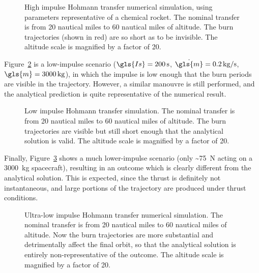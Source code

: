 \documentclass[12pt,openany]{book}
\begin{document}
\begin{figure}[htbp]
  \centering
  \resizebox{0.5\textwidth}{!}{}
  \caption{High impulse Hohmann transfer numerical simulation, using parameters representative of a chemical rocket. The nominal transfer is from 20 nautical miles to 60 nautical miles of altitude. The burn trajectories (shown in red) are so short as to be invisible. The altitude scale is magnified by a factor of 20.}
  \label{fig:hohmann-high-impulse}
\end{figure}

Figure~\ref{fig:hohmann-low-impulse} is a low-impulse scenario (\(\gls{Is}=\SI{200}{s}\), \(\dot{\gls{m}}=\SI{0.2}{kg\per\s}\), \(\gls{m}=\SI{3000}{kg}\)), in which the impulse is low enough that the burn periods are visible in the trajectory. However, a similar manouvre is still performed, and the analytical prediction is quite representative of the numerical result.

\begin{figure}[htbp]
  \centering
  \resizebox{0.5\textwidth}{!}{}
  \caption{Low impulse Hohmann transfer simulation. The nominal transfer is from 20 nautical miles to 60 nautical miles of altitude. The burn trajectories are visible but still short enough that the analytical solution is valid. The altitude scale is magnified by a factor of 20.}
  \label{fig:hohmann-low-impulse}
\end{figure}

Finally, Figure~\ref{fig:hohmann-ultra-low-impulse} shows a much lower-impulse scenario (only \SI{~75}{N} acting on a \SI{3000}{kg} spacecraft), resulting in an outcome which is clearly different from the analytical solution. This is expected, since the thrust is definitely not instantaneous, and large portions of the trajectory are produced under thrust conditions.

\begin{figure}[htbp]
  \centering
  \resizebox{0.5\textwidth}{!}{}
  \caption{Ultra-low impulse Hohmann transfer numerical simulation. The nominal transfer is from 20 nautical miles to 60 nautical miles of altitude. Now the burn trajectories are more substantial and detrimentally affect the final orbit, so that the analytical solution is entirely non-representative of the outcome. The altitude scale is magnified by a factor of 20.}
  \label{fig:hohmann-ultra-low-impulse}
\end{figure}


\printunsrtglossary[type=symbols,style=long]

\clearpage{}
{}


\end{document}
